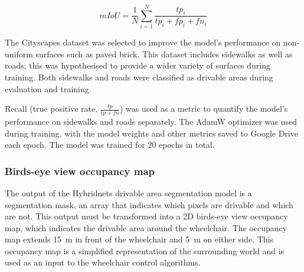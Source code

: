 \begin{equation}
mIoU = \frac{1}{N} \sum_{i=1}^{N} \frac{tp_i}{tp_i + fp_i + fn_i}
\label{eq:miou}
\end{equation}

The Cityscapes dataset was selected to improve the model's performance on non-uniform
surfaces such as paved brick. This dataset includes sidewalks as well as roads;
this was hypothesised to provide a wider variety of surfaces during training.
Both sidewalks and roads were classified as drivable areas during evaluation
and training.

\pagebreak

Recall (true positive rate, $\frac{tp}{tp + fn}$) was used as a metric to quantify the model's
performance on sidewalks and roads separately.
The AdamW optimizer \cite{kingmaAdamMethodStochastic2014}\cite{loshchilovDecoupledWeightDecay2017} was
used during training, with the model weights and other metrics saved to Google Drive
each epoch. The model was trained for 20 epochs in total.


\subsubsection{Birds-eye view occupancy map}
\label{sec:birds_eye_view_occupancy_map}

The output of the Hybridnets drivable area segmentation model is a
segmentation mask, an array that indicates which pixels are drivable
and which are not.
This output must be transformed into a 2D birds-eye view occupancy map,
which indicates the drivable area around the wheelchair. The occupancy
map extends \SI{15}{\metre} in front of the wheelchair and \SI{5}{\metre} on either side.
This occupancy map is a simplified representation of the surrounding world
and is used as an input to the wheelchair control algorithms.

